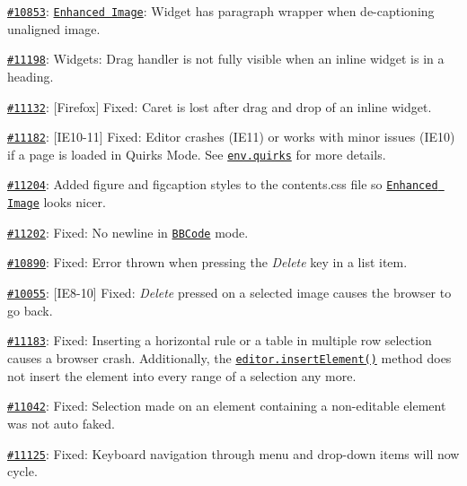 {\begin{DoxyItemize}
\item \href{http://dev.ckeditor.com/ticket/10853}{\tt \#10853}\+: \href{http://ckeditor.com/addon/image2}{\tt Enhanced Image}\+: Widget has paragraph wrapper when de-\/captioning unaligned image.
\item \href{http://dev.ckeditor.com/ticket/11198}{\tt \#11198}\+: Widgets\+: Drag handler is not fully visible when an inline widget is in a heading.
\item \href{http://dev.ckeditor.com/ticket/11132}{\tt \#11132}\+: \mbox{[}Firefox\mbox{]} Fixed\+: Caret is lost after drag and drop of an inline widget.
\item \href{http://dev.ckeditor.com/ticket/11182}{\tt \#11182}\+: \mbox{[}I\+E10-\/11\mbox{]} Fixed\+: Editor crashes (I\+E11) or works with minor issues (I\+E10) if a page is loaded in Quirks Mode. See \href{http://docs.ckeditor.com/#!/api/CKEDITOR.env-property-quirks}{\tt {\ttfamily env.\+quirks}} for more details.
\item \href{http://dev.ckeditor.com/ticket/11204}{\tt \#11204}\+: Added {\ttfamily figure} and {\ttfamily figcaption} styles to the {\ttfamily contents.\+css} file so \href{http://ckeditor.com/addon/image2}{\tt Enhanced Image} looks nicer.
\item \href{http://dev.ckeditor.com/ticket/11202}{\tt \#11202}\+: Fixed\+: No newline in \href{http://ckeditor.com/addon/bbcode}{\tt B\+B\+Code} mode.
\item \href{http://dev.ckeditor.com/ticket/10890}{\tt \#10890}\+: Fixed\+: Error thrown when pressing the {\itshape Delete} key in a list item.
\item \href{http://dev.ckeditor.com/ticket/10055}{\tt \#10055}\+: \mbox{[}I\+E8-\/10\mbox{]} Fixed\+: {\itshape Delete} pressed on a selected image causes the browser to go back.
\item \href{http://dev.ckeditor.com/ticket/11183}{\tt \#11183}\+: Fixed\+: Inserting a horizontal rule or a table in multiple row selection causes a browser crash. Additionally, the \href{http://docs.ckeditor.com/#!/api/CKEDITOR.editor-method-insertElement}{\tt {\ttfamily editor.\+insert\+Element()}} method does not insert the element into every range of a selection any more.
\item \href{http://dev.ckeditor.com/ticket/11042}{\tt \#11042}\+: Fixed\+: Selection made on an element containing a non-\/editable element was not auto faked.
\item \href{http://dev.ckeditor.com/ticket/11125}{\tt \#11125}\+: Fixed\+: Keyboard navigation through menu and drop-\/down items will now cycle.

\end{DoxyItemize}}
